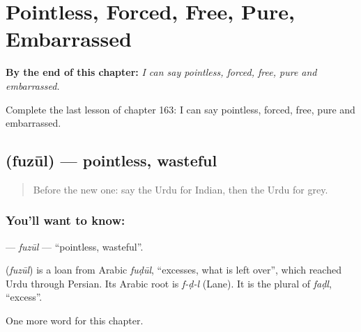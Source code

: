 
\chapter{Pointless, Forced, Free, Pure, Embarrassed}
\label{ch:ur-pointless-forced-free-pure-embarrassed}

\begin{chapteropening}
\textbf{By the end of this chapter:} \emph{I can say pointless, forced, free, pure and embarrassed.}

Complete the last lesson of chapter 163: I can say pointless, forced, free, pure and embarrassed.
\end{chapteropening}

\section[\texorpdfstring{\ur{فضول} (fuzūl)}{فضول (fuzūl)}]{ (fuzūl) — pointless, wasteful}

\label{lesson:UR-C163-fuzul}



\begin{quote}
Before the new one: say the Urdu for Indian, then the Urdu for grey.
\end{quote}

\subsection*{You'll want to know: }
\textbf{} — \emph{fuzūl} — \textquotedblleft{}pointless, wasteful\textquotedblright{}.

\begin{cousinweb}
\textbf{} (\emph{fuzūl}) is a loan from Arabic \emph{fuḍūl}, \textquotedblleft{}excesses, what is left over\textquotedblright{}, which reached Urdu through Persian. Its Arabic root is \emph{f-ḍ-l} (Lane). It is the plural of \emph{faḍl}, \textquotedblleft{}excess\textquotedblright{}.
\end{cousinweb}

\begin{grammarlens}[title={What you've built}]
One more word for this chapter.
\end{grammarlens}

